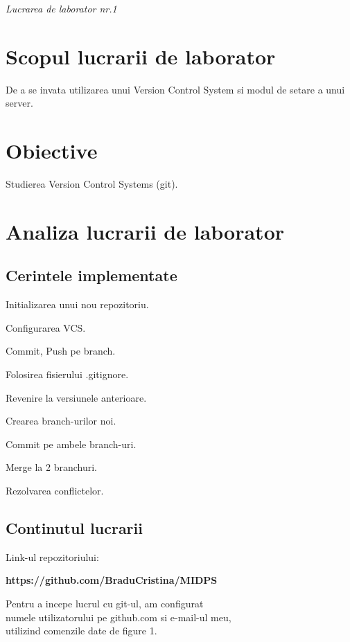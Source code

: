 \documentclass[11pt]{article}
\begin{document}
\begin{LARGE}
\textit{Lucrarea de laborator nr.1}
\end{LARGE}

\section{Scopul lucrarii de laborator}

De a se invata utilizarea unui Version Control System si modul de setare a
unui server.

\section{Obiective}

Studierea Version Control Systems (git).

\section{Analiza lucrarii de laborator}

\subsection{Cerintele implementate}

Initializarea unui nou repozitoriu.

Configurarea VCS.

Commit, Push pe branch.

Folosirea fisierului .gitignore.

Revenire la versiunele anterioare.

Crearea branch-urilor noi.

Commit pe ambele branch-uri.

Merge la 2 branchuri.

Rezolvarea conflictelor.


\subsection{Continutul lucrarii}
Link-ul repozitoriului: 
\begin{center}
\textbf{https://github.com/BraduCristina/MIDPS}
\end{center}

Pentru a incepe lucrul cu git-ul, am configurat
\\numele utilizatorului pe github.com si e-mail-ul meu,
\\utilizind comenzile date de figure 1.
\end{document}
